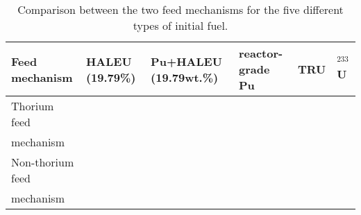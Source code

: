 \begin{table}  [!h]
	\begin{minipage}{\linewidth}
		\renewcommand\footnoterule{}
		\renewcommand{\thefootnote}{\alph{footnote}}
		\caption{Comparison between the two feed mechanisms for the five different 
			types of initial fuel.}
		\label{tab:comp_feeds}
		\vspace{0.1in}
		\begin{tabularx}{\textwidth}{p{} X p{} 
				p{} X X 
			}  %
			\hline
			Feed mechanism & \gls{HALEU} (19.79\%) & Pu+\gls{HALEU} (19.79wt.\%) &  
			reactor-grade Pu & \gls{TRU}& $^{233}$U \\
			\hline
			Thorium feed\\ mechanism&\xmark&\xmark&\xmark&\xmark& \cmark \\
			Non-thorium feed\\ mechanism &\xmark&\xmark&\cmark\footnotemark[1] 
			&\cmark\footnotemark[2] & \xmark\footnotemark[3] \\
			\hline
		\end{tabularx}
		\vspace{-1.5ex}%
	\end{minipage}
\end{table}
\FloatBarrier

